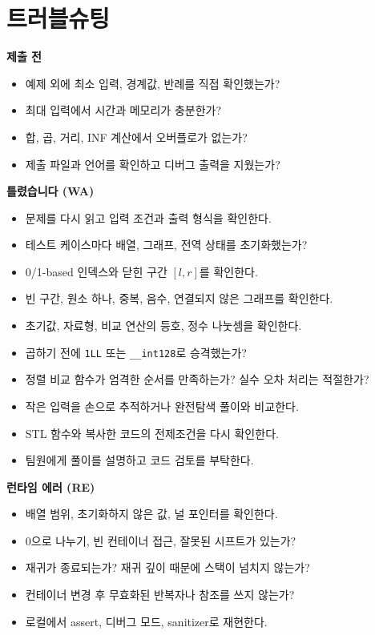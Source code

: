 \section{트러블슈팅}
\begingroup
\footnotesize
{}

\textbf{제출 전}
\begin{itemize}
  \item 예제 외에 최소 입력, 경계값, 반례를 직접 확인했는가?
  \item 최대 입력에서 시간과 메모리가 충분한가?
  \item 합, 곱, 거리, INF 계산에서 오버플로가 없는가?
  \item 제출 파일과 언어를 확인하고 디버그 출력을 지웠는가?
\end{itemize}

\textbf{틀렸습니다 (WA)}
\begin{itemize}
  \item 문제를 다시 읽고 입력 조건과 출력 형식을 확인한다.
  \item 테스트 케이스마다 배열, 그래프, 전역 상태를 초기화했는가?
  \item 0/1-based 인덱스와 닫힌 구간 $[l,r]$를 확인한다.
  \item 빈 구간, 원소 하나, 중복, 음수, 연결되지 않은 그래프를 확인한다.
  \item 초기값, 자료형, 비교 연산의 등호, 정수 나눗셈을 확인한다.
  \item 곱하기 전에 \texttt{1LL} 또는 \texttt{\_\_int128}로 승격했는가?
  \item 정렬 비교 함수가 엄격한 순서를 만족하는가? 실수 오차 처리는 적절한가?
  \item 작은 입력을 손으로 추적하거나 완전탐색 풀이와 비교한다.
  \item STL 함수와 복사한 코드의 전제조건을 다시 확인한다.
  \item 팀원에게 풀이를 설명하고 코드 검토를 부탁한다.
\end{itemize}

\textbf{런타임 에러 (RE)}
\begin{itemize}
  \item 배열 범위, 초기화하지 않은 값, 널 포인터를 확인한다.
  \item 0으로 나누기, 빈 컨테이너 접근, 잘못된 시프트가 있는가?
  \item 재귀가 종료되는가? 재귀 깊이 때문에 스택이 넘치지 않는가?
  \item 컨테이너 변경 후 무효화된 반복자나 참조를 쓰지 않는가?
  \item 로컬에서 assert, 디버그 모드, sanitizer로 재현한다.
\end{itemize}


